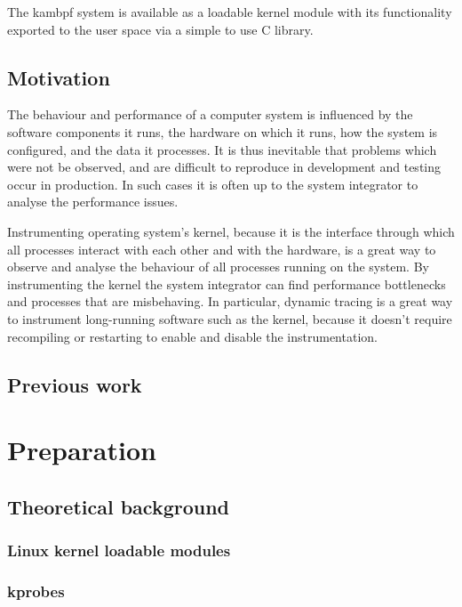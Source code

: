 \documentclass[12pt,twoside,notitlepage]{report}
\begin{document}
    The kambpf system is available as a loadable kernel module with its functionality exported to the user space via a simple to use C library.

    \section{Motivation}
        The behaviour and performance of a computer system is influenced by the software components it runs, the hardware on which it runs, how the system is configured, and the data it processes. It is thus inevitable that problems which were not be observed, and are difficult to reproduce in development and testing occur in production. In such cases it is often up to the system integrator to analyse the performance issues.\cite{DTrace2004}
        
        Instrumenting operating system's kernel, because it is the interface through which all processes interact with each other and with the hardware, is a great way to observe and analyse the behaviour of all processes running on the system. By instrumenting the kernel the system integrator can find performance bottlenecks and processes that are misbehaving. In particular, dynamic tracing is a great way to instrument long-running software such as the kernel, because it doesn't require recompiling or restarting to enable and disable the instrumentation.\cite{DynamicPI1994}

    \section{Previous work}

\chapter{Preparation}
    \section{Theoretical background} 
        \subsection{Linux kernel loadable modules}
        \subsection{kprobes}
\end{document}
